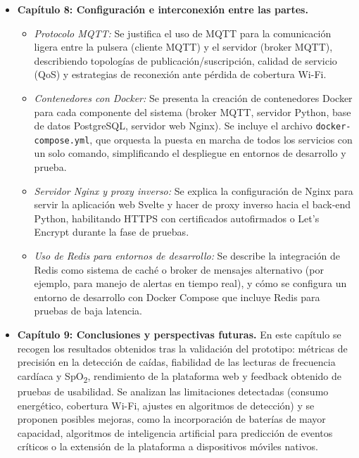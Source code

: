\documentclass[12pt, a4paper]{article}
\begin{document}
\begin{itemize}
		\item \textbf{Capítulo 8: Configuración e interconexión entre las partes.}  
		\begin{itemize}
			\item \emph{Protocolo MQTT:} Se justifica el uso de MQTT para la comunicación ligera entre la pulsera (cliente MQTT) y el servidor (broker MQTT), describiendo topologías de publicación/suscripción, calidad de servicio (QoS) y estrategias de reconexión ante pérdida de cobertura Wi-Fi.  
			\item \emph{Contenedores con Docker:} Se presenta la creación de contenedores Docker para cada componente del sistema (broker MQTT, servidor Python, base de datos PostgreSQL, servidor web Nginx). Se incluye el archivo \texttt{docker-compose.yml}, que orquesta la puesta en marcha de todos los servicios con un solo comando, simplificando el despliegue en entornos de desarrollo y prueba.  
			\item \emph{Servidor Nginx y proxy inverso:} Se explica la configuración de Nginx para servir la aplicación web Svelte y hacer de proxy inverso hacia el back-end Python, habilitando HTTPS con certificados autofirmados o Let's Encrypt durante la fase de pruebas.  
			\item \emph{Uso de Redis para entornos de desarrollo:} Se describe la integración de Redis como sistema de caché o broker de mensajes alternativo (por ejemplo, para manejo de alertas en tiempo real), y cómo se configura un entorno de desarrollo con Docker Compose que incluye Redis para pruebas de baja latencia.  
		\end{itemize}
		
		\item \textbf{Capítulo 9: Conclusiones y perspectivas futuras.}  
		En este capítulo se recogen los resultados obtenidos tras la validación del prototipo: métricas de precisión en la detección de caídas, fiabilidad de las lecturas de frecuencia cardíaca y SpO\textsubscript{2}, rendimiento de la plataforma web y feedback obtenido de pruebas de usabilidad. Se analizan las limitaciones detectadas (consumo energético, cobertura Wi-Fi, ajustes en algoritmos de detección) y se proponen posibles mejoras, como la incorporación de baterías de mayor capacidad, algoritmos de inteligencia artificial para predicción de eventos críticos o la extensión de la plataforma a dispositivos móviles nativos.
		

\end{itemize}
\end{document}

